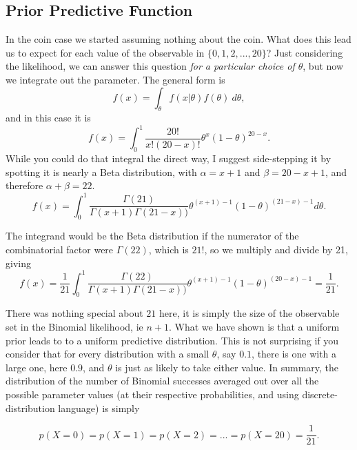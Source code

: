\documentclass{article}
\begin{document}
\subsection{Prior Predictive Function}
In the coin case we started assuming nothing about the coin. What does this lead us to expect for each value of the observable in $\{0,1,2,...,20 \}$? Just considering the likelihood, we can answer this question \textit{for a particular choice of $\theta$}, but now we integrate out the parameter.
The general form is
\begin{equation}
    f(x) = \int_\theta f(x|\theta)f(\theta)\ d\theta,
\end{equation}
and in this case it is
\begin{equation}
    f(x) = \int_{0}^{1} {\frac{20!}{x!(20-x)!}} \theta^x (1-\theta)^{20-x}.
\end{equation}
While you could do that integral the direct way, I suggest side-stepping it by spotting it is nearly a Beta distribution, with $\alpha=x+1$ and $\beta=20-x+1$, and therefore $\alpha+\beta=22$.
\begin{equation}
    f(x) = \int_{0}^{1} {\frac{\Gamma(21)}{\Gamma(x+1) \Gamma(21-x))}} \theta^{(x+1)-1} (1-\theta)^{(21-x)-1} d\theta.
\end{equation}

The integrand would be the Beta distribution if the numerator of the combinatorial factor were $\Gamma(22)$, which is $21!$, so we multiply and divide by 21, giving
\begin{equation}
    f(x) = \frac{1}{21}\int_{0}^{1} {\frac{\Gamma(22)}{\Gamma(x+1) \Gamma(21-x))}} \theta^{(x+1)-1} (1-\theta)^{(20-x)-1}
    = \frac{1}{21}.
\end{equation}

There was nothing special about $21$ here, it is simply the size of the observable set in the Binomial likelihood, ie $n+1$. What we have shown is that a uniform prior leads to to a uniform predictive distribution. This is not surprising if you consider that for every distribution with a small $\theta$, say $0.1$, there is one with a large one, here $0.9$, and $\theta$ is just as likely to take either value. In summary, the distribution of the number of Binomial successes averaged out over all the possible parameter values (at their respective probabilities, and using discrete-distribution language) is simply

\begin{equation}
    p(X=0)=p(X=1)=p(X=2)=...=p(X=20)=\frac{1}{21}. \label{predictive_unif}
\end{equation}
\end{document}
